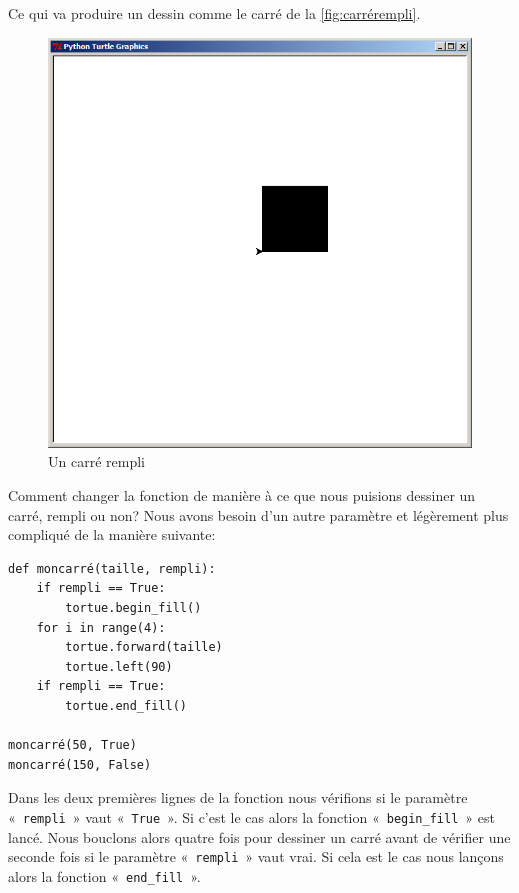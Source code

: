 Ce qui va produire un dessin comme le carré de la \autoref{fig:carrérempli}.
\begin{figure}[h!]
\centering
\includegraphics[scale=0.4]{images/carrerempli}
\caption{Un carré rempli}\label{fig:carrérempli}
\end{figure}

Comment changer la fonction de manière à ce que nous puisions dessiner un carré, rempli ou non? Nous avons besoin d'un autre paramètre et légèrement plus compliqué de la manière suivante:

\begin{Verbatim}[frame=single,rulecolor=\color{mbleu}, label=à taper]
def moncarré(taille, rempli):
    if rempli == True:
        tortue.begin_fill()
    for i in range(4):
        tortue.forward(taille)
        tortue.left(90)
    if rempli == True:
        tortue.end_fill()
        
moncarré(50, True)
moncarré(150, False)
\end{Verbatim}

Dans les deux premières lignes de la fonction nous vérifions si le paramètre «~\texttt{rempli}~» vaut «~\texttt{True}~». Si c'est le cas alors la fonction «~\texttt{begin\_fill}~»  est lancé. Nous bouclons alors quatre fois pour dessiner un carré avant de vérifier une seconde fois si le paramètre «~\texttt{rempli}~» vaut vrai.
Si cela est le cas nous lançons alors la fonction «~\texttt{end\_fill}~».


